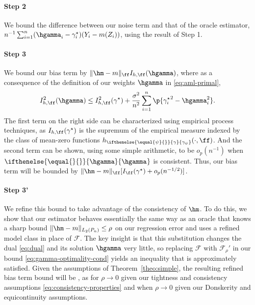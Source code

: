 \documentclass[aos,submission]{imsart}
\theoremstyle{plain}
\theoremstyle{remark}
\newcommand{\riesz}[1][]{\ifthenelse{\equal{#1}{}}{\gamma}{\gamma_{{#1}}}}
\newcommand{\hriesz}[1][]{\ifthenelse{\equal{#1}{}}{\hgamma}{\hgamma_{{#1}}}}
\newcommand{\gammaipw}{\gamma^{\star}}
\DeclarePairedDelimiter\norm{\lVert}{\rVert}
\newcommand{\F}{\mathcal{F}}
\begin{document}
\paragraph*{Step 2} We bound the difference between our noise term and that of the oracle estimator,
$n^{-1}\sum_{i=1}^n (\hgamma_i - \gamma^{\star}_i)(Y_i - m(Z_i))$, using the result of Step 1.


\paragraph*{Step 3} We bound our bias term by $\norm{\hm - m}_{\ff}I_{h, \ff}(\hgamma)$,
where as a consequence of the definition of our weights $\hgamma$ in \eqref{eq:aml-primal}, 
\begin{equation}
\label{eq:gamma-optimality-cond}
I_{h, \ff}^2(\hgamma) \le I_{h,\ff}^2(\gamma^{\star}) + \frac{\sigma^2}{n^2} \sum_{i=1}^n \p{{\gamma^{\star}_i}^2 - \hgamma_i^2}. 
\end{equation}
The first term on the right side can be characterized using empirical process techniques, as $I_{h,\ff}(\gamma^{\star})$ 
is the supremum of the empirical measure indexed by the class of mean-zero functions 
$h_{\riesz[\psi]}(\cdot,\ff)$. And the second term can be shown, using 
some simple arithmetic, to be $o_p(n^{-1})$ when $\hriesz$ is consistent. 
Thus, our bias term will be bounded by $\norm{\hm - m}_{\ff}[I_{\ff}(\gamma^{\star}) + o_p(n^{-1/2})]$.

\paragraph*{Step 3'}
We refine this bound to take advantage of the consistency of $\hm$. 
To do this, we show that our estimator behaves essentially the same way as an oracle
that knows a sharp bound $\norm{\hm - m}_{L_2(\Pn)} \le \rho$ on our regression error
and uses a refined model class \smash{$\F_{\rho}' = \{ f : \norm{f}_{\F}^2 +$} 
in place of $\F$. The key insight is that this substitution changes the dual \eqref{eq:dual} and its solution $\hgamma$ very little,
so replacing $\F$ with $\F_{\rho}'$ in our bound \eqref{eq:gamma-optimality-cond} yields an inequality that is approximately satisfied.
Given the assumptions of Theorem~\ref{theo:simple}, 
the resulting refined bias term bound will be , as 
\smash{$\norm{\hm - m}_{\F_{\rho}'} = O_p(1)$} for $\rho \to 0$ given our
tightness and consistency assumptions \eqref{eq:consistency-properties} and
\smash{$I_{h, \F_{\rho}'}(\gammaipw) = o_p(n^{-1/2})$} when $\rho \to 0$
given our Donskerity and equicontinuity assumptions.\\
\end{document}
